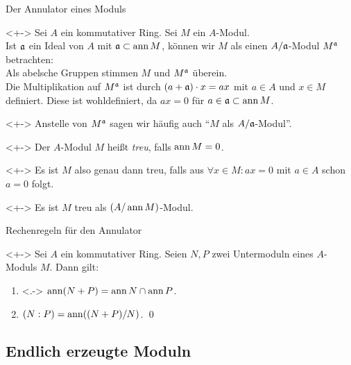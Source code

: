 \begin{frame}{Der Annulator eines Moduls}
	\begin{visibleenv}<+->
		Sei \(A\) ein kommutativer Ring. Sei \(M\) ein \(A\)-Modul.
		\\
		Ist \(\mathfrak{a}\) ein Ideal von \(A\) mit \(\mathfrak{a} \subset \operatorname{ann} M\), können wir \(M\) als
		einen
		\(A/\mathfrak{a}\)-Modul \(M^{\mathfrak{a}}\) betrachten:
		\\
		Als abelsche Gruppen stimmen \(M\) und \(M^{\mathfrak{a}}\) überein.
		\\
		Die Multiplikation auf \(M^{\mathfrak{a}}\) ist durch \((a + \mathfrak{a}) \cdot x = a x\) mit \(a \in A\)
		und \(x \in M\) definiert. Diese ist wohldefiniert, da \(a x = 0\)
		für \(a \in \mathfrak{a} \subset \operatorname{ann} M\).
	\end{visibleenv}
	\begin{visibleenv}<+->
		Anstelle von \(M^{\mathfrak{a}}\) sagen wir häufig auch "`\(M\) als \(A/\mathfrak{a}\)-Modul"'.
	\end{visibleenv}
	\begin{definition}<+->
		Der \(A\)-Modul \(M\) heißt \emph{treu}, falls \(\operatorname{ann} M = 0\).
	\end{definition}
	\begin{visibleenv}<+->
		Es ist \(M\) also genau dann treu, falls aus \(\forall x \in M\colon ax = 0\) mit \(a \in A\) schon
		\(a = 0\) folgt.
	\end{visibleenv}
	\begin{example}<+->
		Es ist \(M\) treu als \((A/\operatorname{ann} M)\)-Modul.
	\end{example}
\end{frame}

\begin{frame}{Rechenregeln für den Annulator}
	\begin{proposition}<+->
		Sei \(A\) ein kommutativer Ring. Seien \(N, P\) zwei Untermoduln eines \(A\)-Moduls \(M\).
		Dann gilt:
		\begin{enumerate}[<+->]
		\item<.->
			\(\operatorname{ann}(N + P) = \operatorname{ann} N \cap \operatorname{ann} P\).
		\item
			\((N : P) = \operatorname{ann}((N + P)/N)\).
			\qed
		\end{enumerate}
	\end{proposition}
\end{frame}

\subsection{Endlich erzeugte Moduln}

